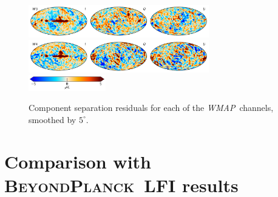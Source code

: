 \documentclass[twocolumn]{../../common/aa}
\def\WMAP{\emph{WMAP}}
\newcommand{\BP}{\textsc{BeyondPlanck}}
\begin{document}
\begin{figure}
	\includegraphics[width=0.7\textwidth]{figures/compsep_res_W3_IQU.pdf}\\
	\includegraphics[width=0.7\textwidth]{figures/compsep_res_W4_IQU.pdf}\\
	\includegraphics[width=0.30\textwidth]{figures/cbar_5uK.pdf}
	\caption{Component separation residuals for each of the \WMAP\ channels, smoothed by $5^\circ$.}
	\label{fig:compsep_residual}
\end{figure}


\section{Comparison with \BP\ LFI results}
\end{document}
